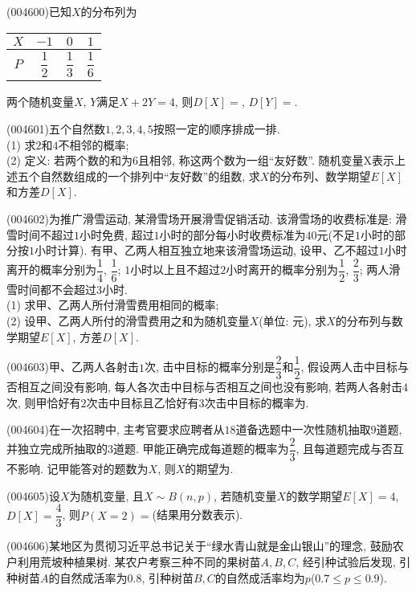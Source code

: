 \item (004600)已知$X$的分布列为
\begin{center}
    \begin{tabular}{|c|c|c|c|}
        \hline
        $X$ & $-1$ & $0$ & $1$ \\ \hline
        $P$ & $\dfrac 12$ & $\dfrac 13$ & $\dfrac 16$ \\ \hline       
    \end{tabular}
\end{center}
两个随机变量$X$, $Y$满足$X+2Y=4$, 则$D[X]=$, $D[Y]=$.
\item (004601)五个自然数$1, 2, 3, 4, 5$按照一定的顺序排成一排.\\
(1) 求$2$和$4$不相邻的概率;\\
(2) 定义: 若两个数的和为$6$且相邻, 称这两个数为一组``友好数''. 随机变量X表示上述五个自然数组成的一个排列中``友好数''的组数, 求$X$的分布列、数学期望$E[X]$和方差$D[X]$.
\item (004602)为推广滑雪运动, 某滑雪场开展滑雪促销活动. 该滑雪场的收费标准是: 滑雪时间不超过$1$小时免费, 超过$1$小时的部分每小时收费标准为$40$元(不足$1$小时的部分按$1$小时计算). 有甲、乙两人相互独立地来该滑雪场运动, 设甲、乙不超过$1$小时离开的概率分别为$\dfrac 14$, $\dfrac 16$; $1$小时以上且不超过$2$小时离开的概率分别为$\dfrac 12$, $\dfrac 23$; 两人滑雪时间都不会超过$3$小时.\\
(1) 求甲、乙两人所付滑雪费用相同的概率;\\
(2) 设甲、乙两人所付的滑雪费用之和为随机变量$X$(单位: 元), 求$X$的分布列与数学期望$E[X]$, 方差$D[X]$.
\item (004603)甲、乙两人各射击$1$次, 击中目标的概率分别是$\dfrac 23$和$\dfrac 12$, 假设两人击中目标与否相互之间没有影响, 每人各次击中目标与否相互之间也没有影响, 若两人各射击$4$次, 则甲恰好有$2$次击中目标且乙恰好有$3$次击中目标的概率为.
\item (004604)在一次招聘中, 主考官要求应聘者从$18$道备选题中一次性随机抽取$9$道题, 并独立完成所抽取的$3$道题. 甲能正确完成每道题的概率为$\dfrac 23$, 且每道题完成与否互不影响. 记甲能答对的题数为$X$, 则$X$的期望为.
\item (004605)设$X$为随机变量, 且$X\sim B(n,p)$, 若随机变量$X$的数学期望$E[X]=4$, $D[X]=\dfrac 43$, 则$P(X=2)=$(结果用分数表示).
\item (004606)某地区为贯彻习近平总书记关于``绿水青山就是金山银山''的理念, 鼓励农户利用荒坡种植果树. 某农户考察三种不同的果树苗$A,B,C$, 经引种试验后发现, 引种树苗$A$的自然成活率为$0.8$, 引种树苗$B,C$的自然成活率均为$p$($0.7\le p\le 0.9$).\\
